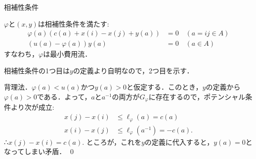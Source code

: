 \documentclass[14pt,aspectratio=169,xcolor=dvipsnames,table,onlytextwidth,dvipdfmx]{beamer}
\begin{document}
\begin{frame}[t]{相補性条件}

    \small
     $\varphi$と$(x, y)$は相補性条件を満たす:
    \setlength{\abovedisplayskip}{3pt}
    \setlength{\belowdisplayskip}{3pt}
    \begin{align*}
        \varphi(a) (c(a) + x(i) - x(j) + y(a)) &= 0 \quad (a = ij \in A) \\
        (u(a) - \varphi(a)) y(a) &= 0 \quad (a \in A)
    \end{align*}
    すなわち，$\varphi$は最小費用流．
    \pause\vfill
    {\footnotesize {} 
    相補性条件の1つ目は$y$の定義より自明なので，2つ目を示す．
    
    \smallskip
    背理法．$\varphi(a) < u(a)$かつ$y(a) > 0$と仮定する．このとき，$y$の定義から$\varphi(a) > 0$である．よって，$a$と$a^{-1}$の両方が$G_\varphi$に存在するので，ポテンシャル条件より次が成立:
    \setlength{\abovedisplayskip}{3pt}
    \setlength{\belowdisplayskip}{3pt}
    \begin{align*}
    x(j) - x(i) &\leq \ell_\varphi(a) = c(a) \\
    x(i) - x(j) &\leq \ell_\varphi(a^{-1}) = - c(a).
    \end{align*}
    ∴$x(j) - x(i) = c(a)$. ところが，これを$y$の定義に代入すると，$y(a) = 0$となってしまい矛盾．
    \qed}
\end{frame}
\end{document}
